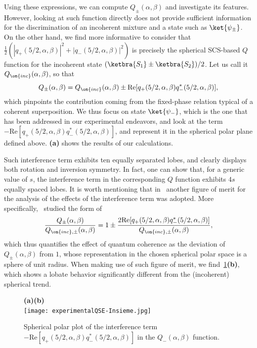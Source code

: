 Using these expressions, we can compute $Q_\pm(\alpha,\beta)$ and investigate its features. However, looking at such function directly does not provide sufficient information for the discrimination of an incoherent mixture and a state such as $\ket{\psi_\pm}$.
On the other hand, we find more informative to consider that $\frac12\left(|q_+(5/2,\alpha,\beta)|^2+|q_-(5/2,\alpha,\beta)|^2\right)$ is precisely the spherical SCS-based $Q$ function for the incoherent state $(\ketbra{S_1}\pm\ketbra{S_2})/2$. Let us call it $Q_{\on{inc}}(\alpha,\beta)$, so that 
\begin{equation}
Q_\pm(\alpha,\beta)=Q_{\on{inc}}(\alpha,\beta) \pm \text{Re}[q_+(5/2,\alpha,\beta)q^*_-(5/2,\alpha,\beta)],
\end{equation}
which pinpoints the contribution coming from the fixed-phase relation typical of a coherent superposition. We thus focus on state $\ket{\psi_-}$, which is the one that has been addressed in our experimental endeavors, and look at the term $-\text{Re}[q_+(5/2,\alpha,\beta)q^*_-(5/2,\alpha,\beta)]$, and represent it in the spherical polar plane defined above. \textbf{(a)} shows the results of our calculations. 

Such interference term exhibits ten equally separated lobes, and clearly displays both rotation and inversion symmetry. In fact, one can show that, for a generic value of $s$, the interference term in the corresponding $Q$ function exhibits $4s$ equally spaced lobes. It is worth mentioning that in~\cite{agarwal1997atomic} another figure of merit for the analysis of the effects of the interference term was adopted. More specifically,~\cite{agarwal1997atomic} studied the form of 
\begin{equation}
    \frac{Q_\pm(\alpha,\beta)}{Q_{\on{inc},\pm}(\alpha,\beta)} =
    1 \pm \frac{2\text{Re}[q_+(5/2,\alpha,\beta)q^*_-(5/2,\alpha,\beta)]}{Q_{\on{inc},\pm}(\alpha,\beta)},
\end{equation}
which thus quantifies the effect of quantum coherence as the deviation of $Q_\pm(\alpha,\beta)$ from $1$, whose representation in the chosen spherical polar space is a sphere of unit radius. When making use of such figure of merit, we find~\cref{fig:expQWs:SCS_plots}\textbf{(b)}, which shows a lobate behavior significantly different from the (incoherent) spherical trend. 

\begin{figure}[tb]
    \centering
    {\bf (a)}\hskip8cm{\bf (b)}\\
    \texttt{[image: experimentalQSE-Insieme.jpg]}
    \caption{Spherical polar plot of the interference term $-\text{Re}[q_+(5/2,\alpha,\beta)q^*_-(5/2,\alpha,\beta)]$ in the $Q_-(\alpha,\beta)$ function.}
    \label{fig:expQWs:SCS_plots}
\end{figure}



